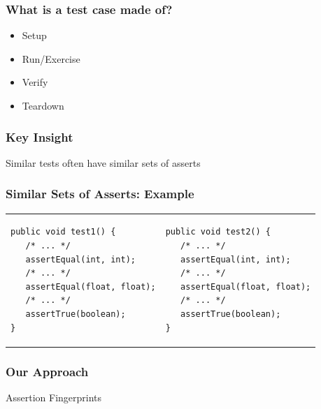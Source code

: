 \documentclass{beamer}
\begin{document}
\begin{frame}
  \frametitle{What is a test case made of?} {\small	
     \vspace*{-1em}
     \Large
     \begin{itemize}
        \item Setup
           \vspace{0.5cm}
        \item Run/Exercise
           \vspace{0.5cm}
        \item \alert<2>{Verify}
           \vspace{0.5cm}
        \item Teardown
     \end{itemize}
	}
\end{frame}

\begin{frame}
  \frametitle{Key Insight} {\small	
     \Large
     Similar tests often have similar sets of asserts
	}
\end{frame}

\begin{frame}[fragile]
  \frametitle{Similar Sets of Asserts: Example} {\small	
     \begin{tabular}{ll}
        \begin{minipage}{0.51\textwidth}
\begin{lstlisting}[]
public void test1() {
   /* ... */
   assertEqual(int, int);
   /* ... */
   assertEqual(float, float);
   /* ... */
   assertTrue(boolean);
}
\end{lstlisting}
        \end{minipage}
        &
        \begin{minipage}{0.51\textwidth}
\begin{lstlisting}[]
public void test2() {
   /* ... */
   assertEqual(int, int);
   /* ... */
   assertEqual(float, float);
   /* ... */
   assertTrue(boolean);
}
\end{lstlisting}
        \end{minipage}
     \end{tabular}
	}
\end{frame}
\note{}

\begin{frame}
  \frametitle{Our Approach} {\small	
     \hspace*{3em}
     \Huge
     Assertion Fingerprints
	}
\end{frame}
\end{document}
